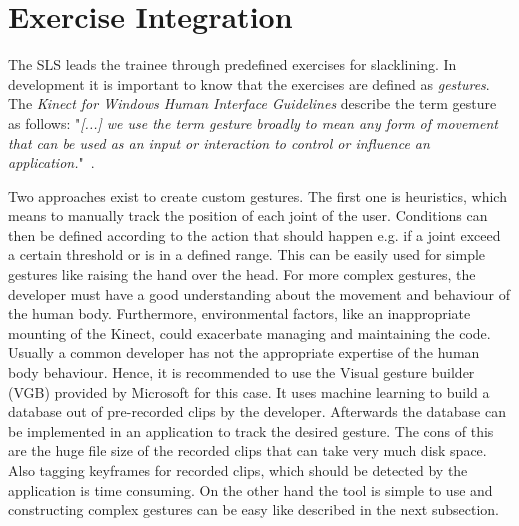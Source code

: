 \section{Exercise Integration}\label{5_2_gestureConstruction}
The SLS leads the trainee through predefined exercises for slacklining. In development it is important to know that the exercises are defined as \textit{gestures}. The \textit{Kinect for Windows Human Interface Guidelines} describe the term gesture as follows: "\textit{[...] we use the term gesture broadly to mean any form of movement that can be used as an input or interaction to control or influence an application.}"~\cite{MicrosoftHIG2014-mh}.

Two approaches exist to create custom gestures.
The first one is heuristics, which means to manually track the position of each joint of the user.
Conditions can then be defined according to the action that should happen e.g. if a joint exceed a certain threshold or is in a defined range.
This can be easily used for simple gestures like raising the hand over the head.
For more complex gestures, the developer must have a good understanding about the movement and behaviour of the human body.
Furthermore, environmental factors, like an inappropriate mounting of the Kinect, could exacerbate managing and maintaining the code.
Usually a common developer has not the appropriate expertise of the human body behaviour. Hence, it is recommended to use the Visual gesture builder (VGB) provided by Microsoft for this case.
It uses machine learning to build a database out of pre-recorded clips by the developer.
Afterwards the database can be implemented in an application to track the desired gesture.
The cons of this are the huge file size of the recorded clips that can take very much disk space.
Also tagging keyframes for recorded clips, which should be detected by the application is time consuming. 
On the other hand the tool is simple to use and constructing complex gestures can be easy like described in the next subsection.


